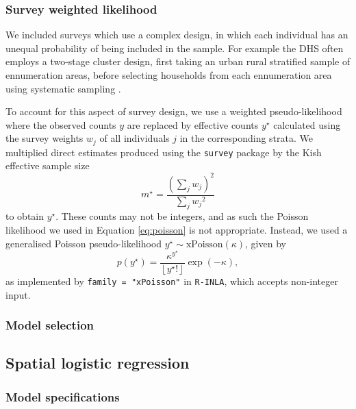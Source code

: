\documentclass[a4paper, nobind]{templates/ociamthesis}
\begin{document}
\hypertarget{survey-weighted-likelihood}{%
\subsubsection{Survey weighted likelihood}\label{survey-weighted-likelihood}}

We included surveys which use a complex design, in which each individual has an unequal probability of being included in the sample.
For example the DHS often employs a two-stage cluster design, first taking an urban rural stratified sample of ennumeration areas, before selecting households from each ennumeration area using systematic sampling \autocite{measure2012sampling}.

To account for this aspect of survey design, we use a weighted pseudo-likelihood where the observed counts \(y\) are replaced by effective counts \(y^\star\) calculated using the survey weights \(w_j\) of all individuals \(j\) in the corresponding strata.
We multiplied direct estimates produced using the \texttt{survey} package \autocite{JSSv009i08} by the Kish effective sample size \autocite{kish1965survey}
\begin{equation}
    m^\star = \frac{\left(\sum_j w_j \right)^2}{\sum_j {w_j}^2}
\end{equation}
to obtain \(y^\star\).
These counts may not be integers, and as such the Poisson likelihood we used in Equation \ref{eq:poisson} is not appropriate.
Instead, we used a generalised Poisson pseudo-likelihood \(y^\star \sim \text{xPoisson}(\kappa)\), given by
\begin{equation}
    p(y^\star) = \frac{\kappa^{y^\star}}{\left \lfloor{y^\star!}\right \rfloor } \exp \left(- \kappa \right),
\end{equation}
as implemented by \texttt{family\ =\ "xPoisson"} in \texttt{R-INLA}, which accepts non-integer input.

\hypertarget{model-selection}{%
\subsubsection{Model selection}\label{model-selection}}

\hypertarget{spatial-logistic-regression}{%
\subsection{Spatial logistic regression}\label{spatial-logistic-regression}}

\hypertarget{model-specifications-1}{%
\subsubsection{Model specifications}\label{model-specifications-1}}
\end{document}
